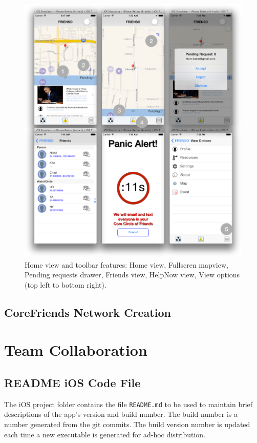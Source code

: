 \begin{figure}
 \centering
   \includegraphics[width=\textwidth]{images/mvp_actual1.png}
    \caption{
	Home view and toolbar features: Home view, Fullscren mapview, Pending requests drawer, 
	Friends view, HelpNow view, View options (top left to bottom right).
	}
	\end{figure}
\subsection{CoreFriends Network Creation}


\section{Team Collaboration}
\subsection{README iOS Code File}
The iOS project folder contains the file \texttt{README.md} to be used to maintain brief
descriptions of the app's version and build number.  The build number is a number 
generated from the git commits. The build version number is updated each time a new 
executable is generated for ad-hoc distribution.

